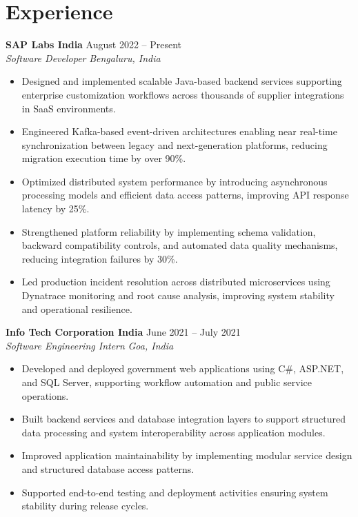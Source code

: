 \documentclass[11pt,a4paper]{article}
\newcommand{\resumeSubheading}[4]{
  \textbf{#1} \hfill #2 \\
  \textit{#3} \hfill \textit{#4}
}
\begin{document}
\section*{Experience}

\resumeSubheading
{SAP Labs India}{August 2022 -- Present}
{Software Developer}{Bengaluru, India}

\vspace{3pt}
\begin{itemize}[leftmargin=*, itemsep=2pt, topsep=0pt]
    \item Designed and implemented scalable Java-based backend services supporting enterprise customization workflows across thousands of supplier integrations in SaaS environments.
    \item Engineered Kafka-based event-driven architectures enabling near real-time synchronization between legacy and next-generation platforms, reducing migration execution time by over 90\%.
    \item Optimized distributed system performance by introducing asynchronous processing models and efficient data access patterns, improving API response latency by 25\%.
    \item Strengthened platform reliability by implementing schema validation, backward compatibility controls, and automated data quality mechanisms, reducing integration failures by 30\%.
    \item Led production incident resolution across distributed microservices using Dynatrace monitoring and root cause analysis, improving system stability and operational resilience.
\end{itemize}

\vspace{8pt}

\resumeSubheading
{Info Tech Corporation India}{June 2021 -- July 2021}
{Software Engineering Intern}{Goa, India}

\vspace{3pt}
\begin{itemize}[leftmargin=*, itemsep=2pt, topsep=0pt]
    \item Developed and deployed government web applications using C\#, ASP.NET, and SQL Server, supporting workflow automation and public service operations.
    \item Built backend services and database integration layers to support structured data processing and system interoperability across application modules.
    \item Improved application maintainability by implementing modular service design and structured database access patterns.
    \item Supported end-to-end testing and deployment activities ensuring system stability during release cycles.
\end{itemize}
\end{document}
